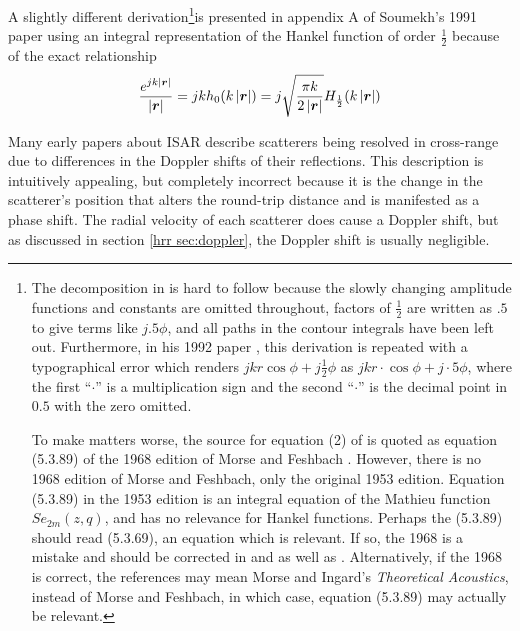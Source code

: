 A slightly different derivation\footnote{The decomposition in
\protect\cite{Sou91} is hard to follow because the slowly changing amplitude
functions and constants are omitted throughout, factors of $\frac{1}{2}$ are
written as $.5$ to give terms like $j.5\phi$, and all paths in the contour
integrals have been left out.  Furthermore, in his 1992 paper
\protect\cite{Sou92a}, this derivation is repeated with a typographical
error which renders $jkr\cos\phi+j\frac{1}{2}\phi$ as
$jkr\cdot\cos\phi+j\cdot 5\phi$, where the first ``$\cdot$'' is a
multiplication sign and the second ``$\cdot$'' is the decimal point in $0.5$
with the zero omitted.  

To make matters worse, the source for equation (2) of \protect\cite{Sou92a}
is quoted as equation (5.3.89) of the 1968 edition of Morse and Feshbach
\protect\cite{Mor53a,Mor53b}.  However, there is no 1968 edition of Morse
and Feshbach, only the original 1953 edition. Equation (5.3.89) in the 1953
edition is an integral equation of the Mathieu function $Se_{2m}(z,q)$, and
has no relevance for Hankel functions.  Perhaps the (5.3.89) should read
(5.3.69), an equation which is relevant.  If so, the 1968 is a mistake and
should be corrected in \protect\cite{Sou91} and \protect\cite{Sou92b} as
well as \protect\cite{Sou92a}.  Alternatively, if the 1968 is correct, the
references may mean Morse and Ingard's {\em Theoretical Acoustics}, instead
of Morse and Feshbach, in which case, equation (5.3.89) may actually be
relevant.}is presented in appendix A of Soumekh's 1991 paper \cite{Sou91}
using an integral representation of the Hankel function of order 
$\frac{1}{2}$ because of the exact relationship
\begin{equation}
\frac{\displaystyle e^{jk\left|\bm{r}\right|}}{\left|\bm{r}\right|}
=jk h_0(k\left|\bm{r}\right|)=
j\sqrt{\frac{\pi k}{2\left|\bm{r}\right|}} 
H_{\frac{1}{2}}(k\left|\bm{r}\right|)
\end{equation}

\label{ii app:dop}

Many early papers about ISAR describe scatterers being resolved in
cross-range due to differences in the Doppler shifts of their reflections. 
This description is intuitively appealing, but completely incorrect because
it is the change in the scatterer's position that alters the round-trip
distance and is manifested as a phase shift.  The radial velocity of each
scatterer does cause a Doppler shift, but as discussed in section 
\ref{hrr sec:doppler}, the Doppler shift is usually negligible.  


